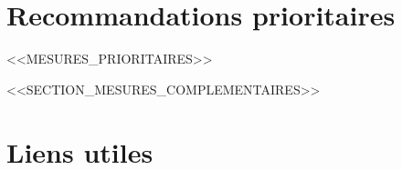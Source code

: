 \documentclass[11pt,a4paper]{article}
\begin{document}
	\section{Recommandations prioritaires}
	\label{sec:recommandations-prioritaires}
	
	<<MESURES_PRIORITAIRES>>
	
	\newpage
	
	
	<<SECTION_MESURES_COMPLEMENTAIRES>>
	
	\clearpage
	
	\section{Liens utiles}
	\label{sec:liens-utiles}
	
\end{document}
